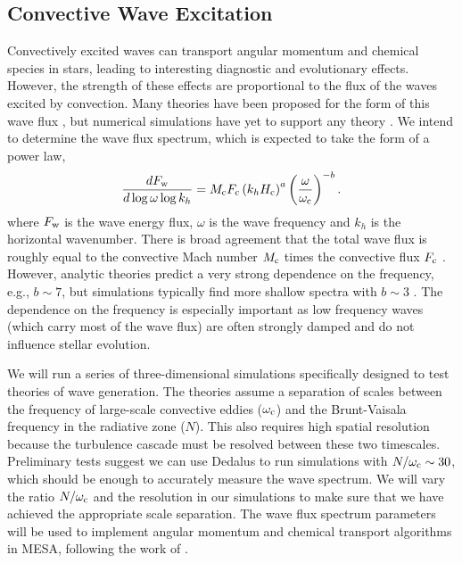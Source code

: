 {\color{purple}
\subsection{Convective Wave Excitation}
}

Convectively excited waves can transport angular momentum and chemical species in stars, leading to interesting diagnostic and evolutionary effects. However, the strength of these effects are proportional to the flux of the waves excited by convection. Many theories have been proposed for the form of this wave flux \citep{Press_1981,Goldreich_1990,Belkacem_2008,Lecoanet_2013}, but numerical simulations have yet to support any theory \citep{Rogers_2006,Rogers_2013,Alvan_2014,Lecoanet_2015}. We intend to determine the wave flux spectrum, which is expected to take the form of a power law,
\begin{equation}
\frac{d F_{\rm w}}{d\log \omega \log k_h} = M_{\rm c}F_{\rm c} \left(k_h H_{\rm c}\right)^{a} \left(\frac{\omega}{\omega_{\rm c}}\right)^{-b}.
\end{equation}
where $F_{\rm w}$ is the wave energy flux, $\omega$ is the wave frequency and $k_h$ is the horizontal wavenumber. There is broad agreement that the total wave flux is roughly equal to the convective Mach number $M_{\rm c}$ times the convective flux $F_{\rm c}$ \citep[e.g.,][]{Rogers_2013,Lecoanet_2015}. However, analytic theories predict a very strong dependence on the frequency, e.g., $b\sim 7$, but simulations typically find more shallow spectra with $b\sim 3$ \citep{Rogers_2013}. The dependence on the frequency is especially important as low frequency waves (which carry most of the wave flux) are often strongly damped and do not influence stellar evolution. 

We will run a series of three-dimensional simulations specifically designed to test theories of wave generation. The theories assume a separation of scales between the frequency of large-scale convective eddies ($\omega_{\rm c}$) and the Brunt-Vaisala frequency in the radiative zone ($N$). This also requires high spatial resolution because the turbulence cascade must be resolved between these two timescales. Preliminary tests suggest we can use Dedalus to run simulations with $N/\omega_{\rm c}\sim 30$, which should be enough to accurately measure the wave spectrum. We will vary the ratio $N/\omega_{\rm c}$ and the resolution in our simulations to make sure that we have achieved the appropriate scale separation. The wave flux spectrum parameters will be used to implement angular momentum and chemical transport algorithms in MESA, following the work of \citet{fullerwave:14,fullerwave:15}.  %

